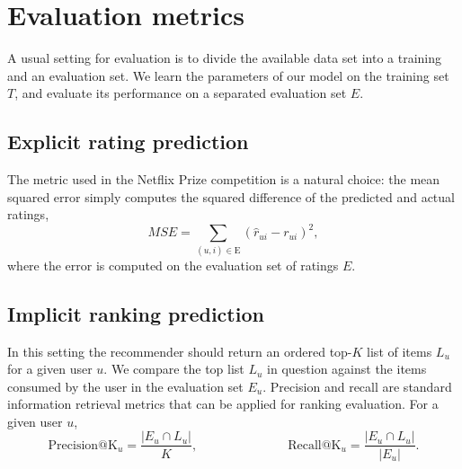 \documentclass[10pt]{article}
\begin{document}
\section{Evaluation metrics}

A usual setting for evaluation is to divide the available data set into a training and an evaluation set.
We learn the parameters of our model on the training set $T$, and evaluate its performance on a separated evaluation set $E$.

\subsection{Explicit rating prediction}

The metric used in the Netflix Prize competition is a natural choice: the mean squared error simply computes the squared difference of the predicted and actual ratings,
\begin{equation}
	MSE = \displaystyle\sum_{(u,i) \in \text{E}}  ( \hat{r}_{ui} - r_{ui} ) ^ 2,
\end{equation}
where the error is computed on the evaluation set of ratings $E$.

\subsection{Implicit ranking prediction}

In this setting the recommender should return an ordered top-$K$ list of items $L_u$ for a given user $u$.
We compare the top list $L_u$ in question against the items consumed by the user in the evaluation set $E_u$.
Precision and recall are standard information retrieval metrics that can be applied for ranking evaluation.
For a given user $u$,
\begin{equation}
	\text{Precision@K}_u = \frac{|E_u \cap L_u|}{K}, \hspace{3cm}  \text{Recall@K}_u = \frac{|E_u \cap L_u|}{|E_u|}.
\end{equation}
\end{document}
